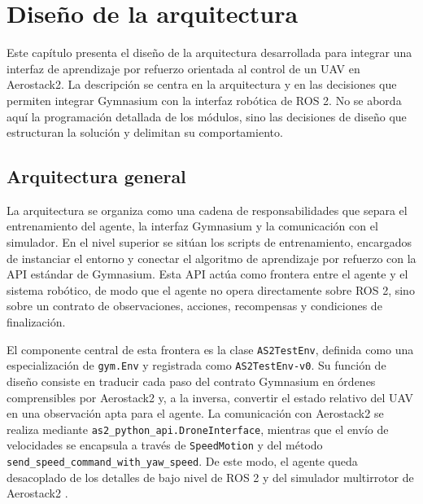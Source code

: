 \chapter{Diseño de la arquitectura} \label{chp:diseno}

Este capítulo presenta el diseño de la arquitectura desarrollada para integrar
una interfaz de aprendizaje por refuerzo orientada al control de un UAV en
Aerostack2. La descripción se centra en la arquitectura y en las decisiones que permiten integrar Gymnasium con la
interfaz robótica de ROS 2. No se aborda aquí la programación detallada de los
módulos, sino las decisiones de diseño que estructuran la solución y delimitan su
comportamiento.

\section{Arquitectura general} \label{sct:diseno:arquitectura}

La arquitectura se organiza como una cadena de responsabilidades que separa el
entrenamiento del agente, la interfaz Gymnasium y la comunicación con el
simulador. En el nivel superior se sitúan los scripts de entrenamiento, encargados
de instanciar el entorno y conectar el algoritmo de aprendizaje por refuerzo con
la API estándar de Gymnasium. Esta API actúa como frontera entre el agente y el sistema robótico, de modo que
el agente no opera directamente sobre ROS 2, sino sobre un contrato de
observaciones, acciones, recompensas y condiciones de finalización.

El componente central de esta frontera es la clase \texttt{AS2TestEnv}, definida
como una especialización de \texttt{gym.Env} y registrada como
\texttt{AS2TestEnv-v0}. Su función de diseño consiste en traducir cada paso del
contrato Gymnasium en órdenes comprensibles por Aerostack2 y, a la inversa, convertir el
estado relativo del UAV en una observación apta para el agente. La comunicación
con Aerostack2 se realiza mediante \texttt{as2\_python\_api.DroneInterface},
mientras que el envío de velocidades se encapsula a través de
\texttt{SpeedMotion} y del método
\texttt{send\_speed\_command\_with\_yaw\_speed}. De este modo, el agente queda
desacoplado de los detalles de bajo nivel de ROS 2 y del simulador multirrotor de
Aerostack2 \cite{fernandez2023aerostack2}.

